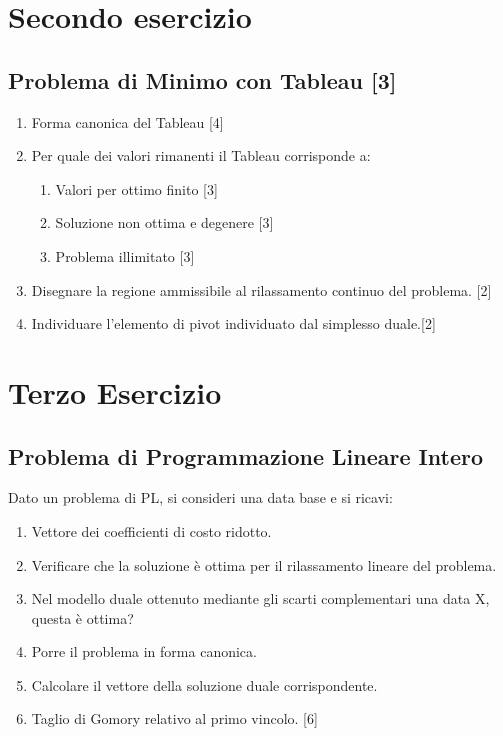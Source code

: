 \documentclass[\main/main.tex]{subfiles}
\begin{document}
\section{Secondo esercizio}

\subsection{Problema di Minimo con Tableau [3]}

\begin{enumerate}
  \item Forma canonica del Tableau [4]
  \item Per quale dei valori rimanenti il Tableau corrisponde a:
        \begin{enumerate}
          \item Valori per ottimo finito [3]
          \item Soluzione non ottima e degenere [3]
          \item Problema illimitato [3]
        \end{enumerate}
  \item Disegnare la regione ammissibile al rilassamento continuo del problema. [2]
  \item Individuare l'elemento di pivot individuato dal simplesso duale.[2]
\end{enumerate}

\section{Terzo Esercizio}

\subsection{Problema di Programmazione Lineare Intero}
Dato un problema di PL, si consideri una data base e si ricavi:

\begin{enumerate}
  \item Vettore dei coefficienti di costo ridotto.
  \item Verificare che la soluzione è ottima per il rilassamento lineare del problema.
  \item Nel modello duale ottenuto mediante gli scarti complementari una data X, questa è ottima?
  \item Porre il problema in forma canonica.
  \item Calcolare il vettore della soluzione duale corrispondente.
  \item Taglio di Gomory relativo al primo vincolo. [6]
\end{enumerate}
\end{document}
